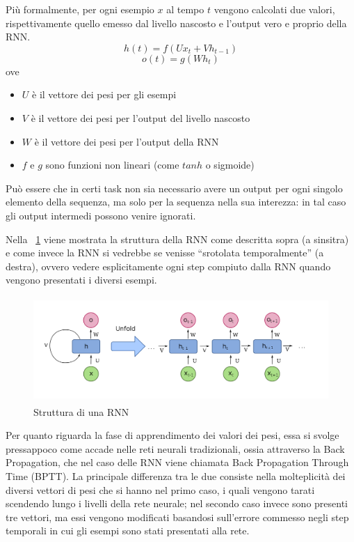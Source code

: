 Più formalmente, per ogni esempio $x$ al tempo $t$ vengono calcolati due valori, rispettivamente quello emesso dal livello nascosto e l'output vero e proprio della RNN.
\begin{equation*}
    h(t) = f(U x_t + V h_{t-1})
\end{equation*}
\begin{equation*}
    o(t) = g(W h_t)
\end{equation*}
ove
\begin{itemize}
    \item $U$ è il vettore dei pesi per gli esempi
    \item $V$ è il vettore dei pesi per l'output del livello nascosto
    \item $W$ è il vettore dei pesi per l'output della RNN
    \item $f$ e $g$ sono funzioni non lineari (come $tanh$ o sigmoide)
\end{itemize}
Può essere che in certi task non sia necessario avere un output per ogni singolo elemento della sequenza, ma solo per la sequenza nella sua interezza: in tal caso gli output intermedi possono venire ignorati.

Nella \figurename~\ref{fig:RNN} viene mostrata la struttura della RNN come descritta sopra (a sinsitra) e come invece la RNN si vedrebbe se venisse ``srotolata temporalmente'' (a destra), ovvero vedere esplicitamente ogni step compiuto dalla RNN quando vengono presentati i diversi esempi.

\begin{figure}
    \centering
    \includegraphics[height=4cm]{pictures/Recurrent_neural_network_unfold.png}
    \caption{Struttura di una RNN}
    \label{fig:RNN}
\end{figure}

Per quanto riguarda la fase di apprendimento dei valori dei pesi, essa si svolge pressappoco come accade nelle reti neurali tradizionali, ossia attraverso la Back Propagation, che nel caso delle RNN viene chiamata Back Propagation Through Time (BPTT). La principale differenza tra le due consiste nella molteplicità dei diversi vettori di pesi che si hanno nel primo caso, i quali vengono tarati scendendo lungo i livelli della rete neurale; nel secondo caso invece sono presenti tre vettori, ma essi vengono modificati basandosi sull'errore commesso negli step temporali in cui gli esempi sono stati presentati alla rete.

